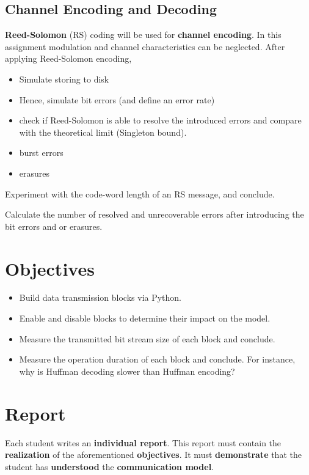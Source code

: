 \documentclass[12pt,a4paper]{article}
\begin{document}
\subsection{Channel Encoding and Decoding}
\textbf{Reed-Solomon} (RS) coding will be used for \textbf{channel encoding}. 
In this assignment modulation and channel characteristics can be neglected.
After applying Reed-Solomon encoding, 
\begin{itemize}
	\item Simulate storing to disk
	\item Hence, simulate bit errors (and define an error rate)
	\item check if Reed-Solomon is able to resolve the introduced errors and compare with the theoretical limit (Singleton bound).
	\item burst errors
	\item erasures
\end{itemize}

\begin{question}
	Experiment with the code-word length of an RS message, and conclude.%
\end{question}

\begin{question}
	Calculate the number of resolved and unrecoverable errors after introducing the bit errors and or erasures.
\end{question}
 

\section{Objectives}
\begin{itemize}
	\item Build data transmission blocks via Python.%
	\item Enable and disable blocks to determine their impact on the model.%
	\item Measure the transmitted bit stream size of each block and conclude.
	\item Measure the operation duration of each block and conclude.
	For instance, why is Huffman decoding slower than Huffman encoding?
\end{itemize}

\section{Report}
Each student writes an \textbf{individual report}. This report must contain the \textbf{realization} of the aforementioned \textbf{objectives}. It must \textbf{demonstrate} that the student has \textbf{understood} the \textbf{communication model}. 
\end{document}
